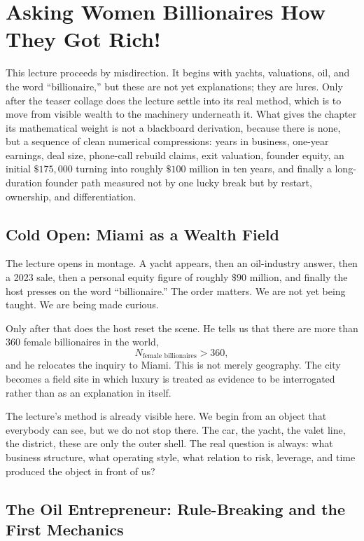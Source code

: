 \chapter{Asking Women Billionaires How They Got Rich!}

This lecture proceeds by misdirection. It begins with yachts, valuations, oil, and the word ``billionaire,'' but these are not yet explanations; they are lures. Only after the teaser collage does the lecture settle into its real method, which is to move from visible wealth to the machinery underneath it. What gives the chapter its mathematical weight is not a blackboard derivation, because there is none, but a sequence of clean numerical compressions: years in business, one-year earnings, deal size, phone-call rebuild claims, exit valuation, founder equity, an initial \(\$175{,}000\) turning into roughly \(\$100\) million in ten years, and finally a long-duration founder path measured not by one lucky break but by restart, ownership, and differentiation.

\section{Cold Open: Miami as a Wealth Field}

The lecture opens in montage. A yacht appears, then an oil-industry answer, then a 2023 sale, then a personal equity figure of roughly \(\$90\) million, and finally the host presses on the word ``billionaire.'' The order matters. We are not yet being taught. We are being made curious.

Only after that does the host reset the scene. He tells us that there are more than \(360\) female billionaires in the world,
\begin{equation}
N_{\text{female billionaires}} > 360,
\end{equation}
and he relocates the inquiry to Miami. This is not merely geography. The city becomes a field site in which luxury is treated as evidence to be interrogated rather than as an explanation in itself.

The lecture's method is already visible here. We begin from an object that everybody can see, but we do not stop there. The car, the yacht, the valet line, the district, these are only the outer shell. The real question is always: what business structure, what operating style, what relation to risk, leverage, and time produced the object in front of us?

\section{The Oil Entrepreneur: Rule-Breaking and the First Mechanics}

